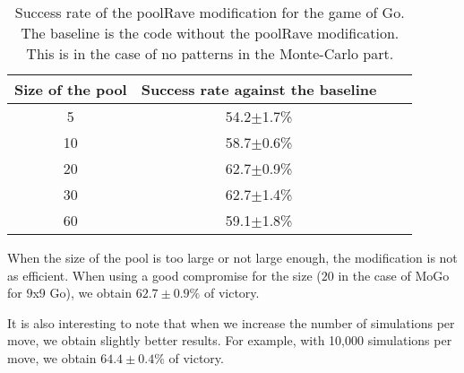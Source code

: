 \documentclass{llncs}
\begin{document}

\begin{table}
\begin{center}
\begin{tabular}{|c|c|c|c|}
\hline
 Size of the pool & Success rate against the baseline \\
\hline
5 & 54.2$\pm$1.7\% \\ 
10 & 58.7$\pm$0.6\% \\
20 & 62.7$\pm$0.9\% \\
30 & 62.7$\pm$1.4\% \\
60 & 59.1$\pm$1.8\% \\

\hline
\end{tabular}
\caption{\label{go1000}Success rate of the poolRave modification for the game of Go. The baseline is the code without the poolRave modification. This is in the case of no patterns in the Monte-Carlo part.}
\end{center}
\end{table}





When the size of the pool is too large or not large enough, the modification is not as efficient.
When using a good compromise for the size ($20$ in the case of MoGo for $9$x$9$ Go), we obtain $62.7\pm0.9\%$ of victory.

It is also interesting to note that when we increase the number of simulations per move, we obtain slightly better results. For example, with 10,000 simulations per move, we obtain $64.4\pm0.4\%$ of victory.
\end{document}
